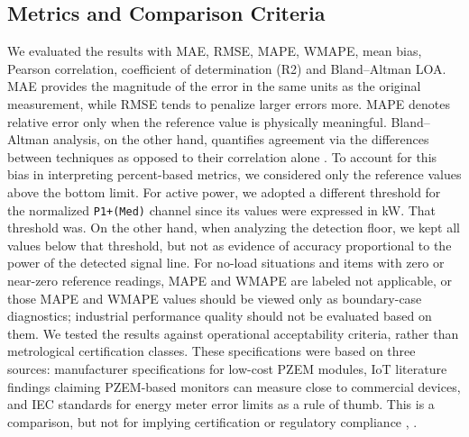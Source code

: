 \documentclass[technologies,article,submit,pdftex,moreauthors]{Definitions/mdpi}
\begin{document}
\subsection{Metrics and Comparison Criteria}
\label{subsec:metrics-criteria}
We evaluated the results with MAE, RMSE, MAPE, WMAPE, mean bias, Pearson correlation, coefficient of determination (R2) and Bland–Altman LOA. MAE provides the magnitude of the error in the same units as the original measurement, while RMSE tends to penalize larger errors more. MAPE denotes relative error only when the reference value is physically meaningful. Bland–Altman analysis, on the other hand, quantifies agreement via the differences between techniques as opposed to their correlation alone \cite{r2_bland}.
To account for this bias in interpreting percent-based metrics, we considered only the reference values above the bottom limit. For active power, we adopted a different threshold for the normalized \texttt{P1+(Med)} channel since its values were expressed in kW. That threshold was. On the other hand, when analyzing the detection floor, we kept all values below that threshold, but not as evidence of accuracy proportional to the power of the detected signal line. For no-load situations and items with zero or near-zero reference readings, MAPE and WMAPE are labeled not applicable, or those MAPE and WMAPE values should be viewed only as boundary-case diagnostics; industrial performance quality should not be evaluated based on them.
We tested the results against operational acceptability criteria, rather than metrological certification classes. These specifications were based on three sources: manufacturer specifications for low-cost PZEM modules, IoT literature findings claiming PZEM-based monitors can measure close to commercial devices, and IEC standards for energy meter error limits as a rule of thumb. This is a comparison, but not for implying certification or regulatory compliance \cite{ref24}, \cite{ref25}. 
\end{document}

